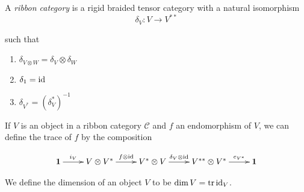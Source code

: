 \begin{defn}

    A \emph{ribbon category} is a rigid braided tensor category with a natural
    isomorphism
    \begin{equation}
        \delta_V: V \to V^{**}
    \end{equation}

such that 
\begin{enumerate}
    \renewcommand{\labelenumi}{\roman{enumi})}

    \item $\delta_{V \otimes W} = \delta_V \otimes \delta_W$
    \item $\delta_1 = \operatorname{id}$
    \item $\delta_{V^*} = (\delta_V^*)^{-1}$
\end{enumerate}

\end{defn}

If $V$ is an object in a ribbon category $\mathcal{C}$ and $f$ an endomorphism
of $V$, we can define the trace of $f$ by the composition

\begin{equation}
    \xymatrix{
    \mathbf{1} \ar[r]^-{i_V} & V \otimes V^* \ar[r]^-{f \otimes \id} & V^* \otimes V \ar[r]^-{\delta_V \otimes \id} & V^{**} \otimes V^* \ar[r]^-{e_{V^*}} & 
    \mathbf{1}
    }
\end{equation}

We define the dimension of an object $V$ to be $\dim V = \operatorname{tr} \operatorname{id}_V$.


